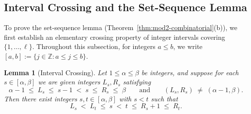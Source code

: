 \documentclass[11pt]{article}
\newtheorem{lemma}[theorem]{Lemma}
\theoremstyle{definition}
\theoremstyle{remark}
\begin{document}
\subsection{Interval Crossing and the Set-Sequence Lemma}
\label{subsec:bottleneck}

To prove the set-sequence lemma (Theorem~\ref{thm:mod2-combinatorial}(b)), we first establish an elementary crossing property of integer intervals covering $\{1, \dots, \ell\}$. Throughout this subsection, for integers $a \le b$, we write $[a, b] := \{j \in \mathbb{Z} : a \le j \le b\}$.

\begin{lemma}[Interval Crossing]
\label{lem:interval-crossing}
Let $1 \le \alpha \le \beta$ be integers, and suppose for each $s \in [\alpha, \beta]$ we are given integers $L_s, R_s$ satisfying
\[
\alpha - 1 \;\le\; L_s \;\le\; s - 1 \;<\; s \;\le\; R_s \;\le\; \beta \qquad \text{and} \qquad (L_s, R_s) \;\ne\; (\alpha - 1, \beta).
\]
Then there exist integers $s, t \in [\alpha, \beta]$ with $s < t$ such that
\[
L_s \;<\; L_t \;\le\; s \;<\; t \;\le\; R_s + 1 \;\le\; R_t.
\]
\end{lemma}
\end{document}
